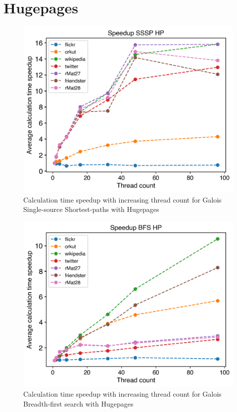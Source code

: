 \section{Hugepages}
\begin{figure}
	\includegraphics[width=\linewidth]{../../plots/singleNodeSSSPGaloisHPThreads.png}
	\caption{Calculation time speedup with increasing thread count for Galois Single-source Shortest-paths with Hugepages}
	\label{fig:galoisHPSpeedupSSSP}
\end{figure}

\begin{figure}
	\includegraphics[width=\linewidth]{../../plots/singleNodeBFSGaloisHPThreads.png}
	\caption{Calculation time speedup with increasing thread count for Galois Breadth-first search with Hugepages}
	\label{fig:galoisHPSpeedupBFS}
\end{figure}

